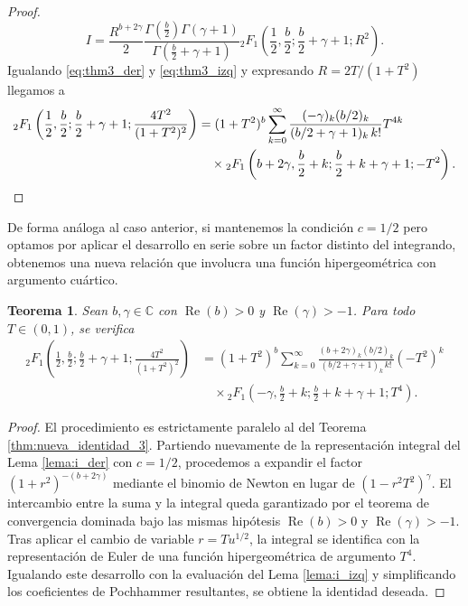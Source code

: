 \documentclass[12pt,a4paper]{book}
\newtheorem{theorem}{Teorema}
\begin{document}
\begin{proof}
\begin{equation}
\label{eq:thm3_izq}
    I = \frac{R^{b+2\gamma}}{2} \frac{\Gamma\left(\frac{b}{2}\right)\Gamma(\gamma+1)}{\Gamma\left(\frac{b}{2}+\gamma+1\right)} {}_{2}F_{1}\left(\frac{1}{2}, \frac{b}{2}; \frac{b}{2}+\gamma+1; R^2\right).
\end{equation}
Igualando \eqref{eq:thm3_der} y \eqref{eq:thm3_izq} y expresando $R = 2T/(1+T^2)$ llegamos a
\begin{align*}
    {}_{2}F_{1}\left(\frac{1}{2}, \frac{b}{2}; \frac{b}{2}+\gamma+1; \frac{4T^2}{(1+T^2)^2}\right) &= (1+T^2)^b \sum_{k=0}^{\infty} \frac{(-\gamma)_k (b/2)_k}{(b/2+\gamma+1)_k \, k!} T^{4k} \\
    &\quad \times {}_{2}F_{1}\left(b+2\gamma, \frac{b}{2}+k; \frac{b}{2}+k+\gamma+1; -T^2\right).
    \qedhere
\end{align*}
\end{proof}

De forma análoga al caso anterior, si mantenemos la condición $c = 1/2$ pero optamos por aplicar el desarrollo en serie sobre un factor distinto del integrando, obtenemos una nueva relación que involucra una función hipergeométrica con argumento cuártico.

\begin{theorem}
\label{thm:nueva_identidad_4}
Sean $b, \gamma \in \mathbb{C}$ con $\operatorname{Re}(b) > 0$ y $\operatorname{Re}(\gamma) > -1$. Para todo $T \in (0, 1)$, se verifica
\begin{align*}
    {}_{2}F_{1}\left(\frac{1}{2}, \frac{b}{2}; \frac{b}{2}+\gamma+1; \frac{4T^2}{(1+T^2)^2}\right) &= (1+T^2)^b \sum_{k=0}^{\infty} \frac{(b+2\gamma)_k (b/2)_k}{(b/2+\gamma+1)_k \, k!} (-T^2)^k \\
    &\quad \times {}_{2}F_{1}\left(-\gamma, \frac{b}{2}+k; \frac{b}{2}+k+\gamma+1; T^4\right).
\end{align*}
\end{theorem}

\begin{proof}
El procedimiento es estrictamente paralelo al del Teorema \ref{thm:nueva_identidad_3}. Partiendo nuevamente de la representación integral del Lema \ref{lema:i_der} con $c = 1/2$, procedemos a expandir el factor $(1+r^2)^{-(b+2\gamma)}$ mediante el binomio de Newton en lugar de $(1-r^2T^2)^\gamma$. El intercambio entre la suma y la integral queda garantizado por el teorema de convergencia dominada bajo las mismas hipótesis $\operatorname{Re}(b) > 0$ y $\operatorname{Re}(\gamma) > -1$. Tras aplicar el cambio de variable $r = T u^{1/2}$, la integral se identifica con la representación de Euler de una función hipergeométrica de argumento $T^4$. Igualando este desarrollo con la evaluación del Lema \ref{lema:i_izq} y simplificando los coeficientes de Pochhammer resultantes, se obtiene la identidad deseada.
\end{proof}
\end{document}
